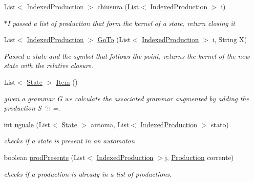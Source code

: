 \begin{DoxyCompactItemize}
\item 
List$<$ \hyperlink{classcontext_free_1_1parser_1_1_indexed_production}{Indexed\-Production} $>$ \hyperlink{classcontext_free_1_1parser_1_1_l_r0_aa0e8369b6e2db7489437ad8a6f217d22}{chiusura} (List$<$ \hyperlink{classcontext_free_1_1parser_1_1_indexed_production}{Indexed\-Production} $>$ i)
\begin{DoxyCompactList}\small\item\em $\ast$\-I passed a list of production that form the kernel of a state, return closing it \end{DoxyCompactList}\item 
List$<$ \hyperlink{classcontext_free_1_1parser_1_1_indexed_production}{Indexed\-Production} $>$ \hyperlink{classcontext_free_1_1parser_1_1_l_r0_aea1ecb06a1880a8bc5eeb4efcca0ecea}{Go\-To} (List$<$ \hyperlink{classcontext_free_1_1parser_1_1_indexed_production}{Indexed\-Production} $>$ i, String X)
\begin{DoxyCompactList}\small\item\em Passed a state and the symbol that follows the point, returns the kernel of the new state with the relative closure. \end{DoxyCompactList}\item 
List$<$ \hyperlink{classcontext_free_1_1parser_1_1_state}{State} $>$ \hyperlink{classcontext_free_1_1parser_1_1_l_r0_aa96d752420b690ccbbc9fad67691f36a}{Item} ()
\begin{DoxyCompactList}\small\item\em given a grammar G we calculate the associated grammar augmented by adding the production S '\-:\-: =. \end{DoxyCompactList}\item 
int \hyperlink{classcontext_free_1_1parser_1_1_l_r0_a8de929e041a5a1a273e6ddd05dc7e0ca}{uguale} (List$<$ \hyperlink{classcontext_free_1_1parser_1_1_state}{State} $>$ automa, List$<$ \hyperlink{classcontext_free_1_1parser_1_1_indexed_production}{Indexed\-Production} $>$ stato)
\begin{DoxyCompactList}\small\item\em checks if a state is present in an automaton \end{DoxyCompactList}\item 
boolean \hyperlink{classcontext_free_1_1parser_1_1_l_r0_a242530010547a830ad1b9c35a724a7e6}{prod\-Presente} (List$<$ \hyperlink{classcontext_free_1_1parser_1_1_indexed_production}{Indexed\-Production} $>$j, \hyperlink{classcontext_free_1_1grammar_1_1_production}{Production} corrente)
\begin{DoxyCompactList}\small\item\em checks if a production is already in a list of productions. \end{DoxyCompactList}\end{DoxyCompactItemize}
